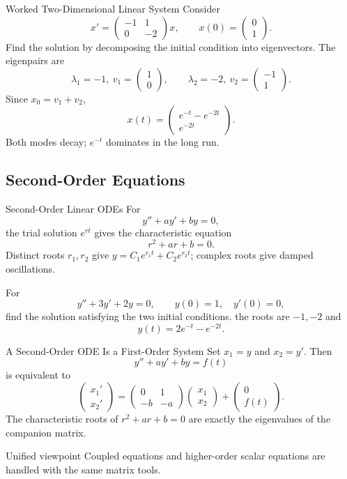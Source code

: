 \documentclass[aspectratio=169]{beamer}
\begin{document}
\begin{frame}{Worked Two-Dimensional Linear System}
Consider
\[
x'=\begin{pmatrix}-1&1\\0&-2\end{pmatrix}x,
\qquad x(0)=\begin{pmatrix}0\\1\end{pmatrix}.
\]
Find the solution by decomposing the initial condition into eigenvectors.
\pause
The eigenpairs are
\[
\lambda_1=-1,\ v_1=\begin{pmatrix}1\\0\end{pmatrix},
\qquad
\lambda_2=-2,\ v_2=\begin{pmatrix}-1\\1\end{pmatrix}.
\]
Since $x_0=v_1+v_2$,
\[
\boxed{x(t)=\begin{pmatrix}e^{-t}-e^{-2t}\\e^{-2t}\end{pmatrix}.}
\]
Both modes decay; $e^{-t}$ dominates in the long run.
\end{frame}

\subsection{Second-Order Equations}

\begin{frame}{Second-Order Linear ODEs}
For
\[
y''+ay'+by=0,
\]
the trial solution $e^{rt}$ gives the characteristic equation
\[
r^2+ar+b=0.
\]
\pause
Distinct roots $r_1,r_2$ give
$y=C_1e^{r_1t}+C_2e^{r_2t}$; complex roots give damped oscillations.
\medskip

For
\[
y''+3y'+2y=0,\qquad y(0)=1,\quad y'(0)=0,
\]
find the solution satisfying the two initial conditions.
\pause
the roots are $-1,-2$ and
\[
\boxed{y(t)=2e^{-t}-e^{-2t}}.
\]
\end{frame}

\begin{frame}{A Second-Order ODE Is a First-Order System}
Set $x_1=y$ and $x_2=y'$. Then
\[
y''+ay'+by=f(t)
\]
is equivalent to
\[
\boxed{
\begin{pmatrix}x_1'\\x_2'\end{pmatrix}
=\begin{pmatrix}0&1\\-b&-a\end{pmatrix}
\begin{pmatrix}x_1\\x_2\end{pmatrix}
+\begin{pmatrix}0\\f(t)\end{pmatrix}.}
\]
\pause
The characteristic roots of $r^2+ar+b=0$ are exactly the eigenvalues of the
companion matrix.
\begin{block}{Unified viewpoint}
Coupled equations and higher-order scalar equations are handled with the same
matrix tools.
\end{block}
\end{frame}
\end{document}
